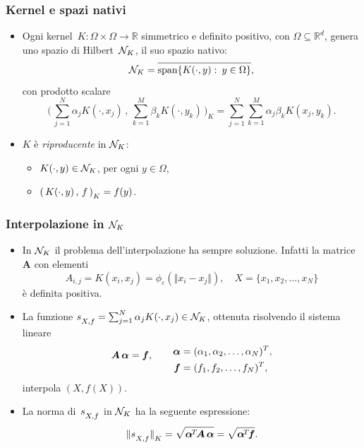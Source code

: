 \documentclass[10pt]{beamer}
\theoremstyle{definition}
\theoremstyle{plain}
\def\R{\mathbb R}
\def\Cal#1{{\cal #1}}
\def\form#1#2{(\,#1\,,\,#2\,)}
\def\Bform#1#2{\biggl(\,#1\,,\,#2\,\biggr)}
\def\norm#1{\Vert #1\Vert}
\def\hbyw#1#2{\vbox to #1{\vfil \hbox to #2{\hfil}}}
\def\hbywtop#1#2{\vtop to #1{\vfil \hbox to #2{\hfil}}}
\def\lK{{\lower.5ex\hbox{$\scriptstyle K$}}}
\def\lXf{{\lower.5ex\hbox{$\scriptstyle X, f$}}}
\begin{document}
\begin{frame}
\frametitle{Kernel e spazi nativi}
\begin{itemize}
\item
Ogni \alert{kernel}~$K:\Omega\times\Omega\to\R$ simmetrico e definito positivo, con $\Omega\subseteq\R^d$, genera uno spazio di Hilbert~$\Cal N_K$, il suo \alert{spazio nativo}:
$$
\Cal N_K = \overline{\operatorname{span}\{K(\cdot, y):\> y\in\Omega\}\hbyw{2ex}{0em}},
$$
con prodotto scalare
$$
\Bform{\sum_{j=1}^N\alpha_jK(\cdot, x_j)}{\sum_{k=1}^M\beta_k K(\cdot,y_k)}_{\!\!K} =  \sum_{j=1}^N\sum_{k=1}^M \alpha_j \beta_k K(x_j,y_k).
$$


\item
$K$ è \emph{riproducente} in $\Cal N_K$:
\begin{itemize}
\item $K(\cdot, y) \in\Cal N_K$, \quad per ogni $y\in\Omega$,
\item  $\form{K(\cdot, y)}f_{\lK} = f(y)$.
\end{itemize}
\end{itemize}
\end{frame}


\begin{frame}
\frametitle{Interpolazione in $\Cal N_K$}
\begin{itemize}
\item 
In $\Cal N_K$ il problema dell’interpolazione ha sempre soluzione.  Infatti la matrice $\bm A$ con elementi
$$
A_{i,j} = K(x_i, x_j) = \phi_\varepsilon( \norm{x_i-x_j}), \quad  X=\{x_1,x_2,\dots,x_N\}
$$
è definita positiva.

\item
La funzione $s_\lXf = \sum_{j=1}^N \alpha_j K(\cdot, x_j)\in\Cal N_K$, ottenuta risolvendo il sistema lineare
 $$
 \bm A\,\bm\alpha = \bm f, \qquad  \lower1ex\hbox{$\begin{aligned} 
 								\bm\alpha &= (\alpha_1,\alpha_2,\dots,\alpha_N)^T, \\
								\bm f &= (f_1,f_2,\dots,f_N)^T,
								\end{aligned}$}
$$
interpola $(X, f(X))$.
\item
La norma di~$s_\lXf$ in $\Cal N_K$ ha la seguente espressione:
$$
\norm{s_\lXf}_\lK= \sqrt{\hbywtop{.2ex}{0em}\hbyw{1.8ex}{0em}\bm\alpha^{\!T\!}\bm A\,\bm\alpha} = \sqrt{\hbywtop{.2ex}{0em}\hbyw{1.8ex}{0em}\bm\alpha^{\!T\!}\bm f}.
$$
\end{itemize}
\end{frame}
\end{document}
